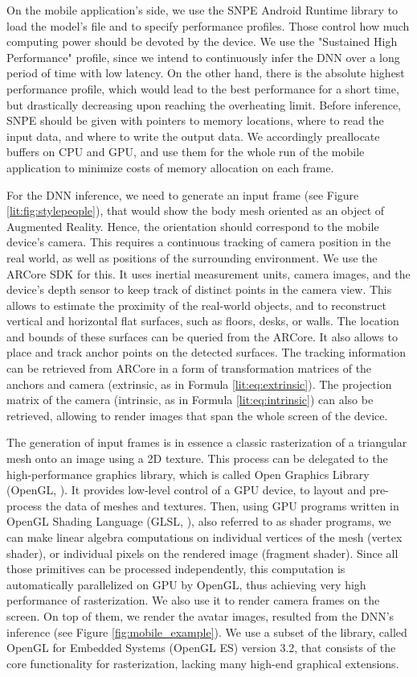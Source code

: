 On the mobile application's side, we use the SNPE Android Runtime library to load the model's file and to specify performance profiles. Those control how much computing power should be devoted by the device. We use the "Sustained High Performance" profile, since we intend to continuously infer the DNN over a long period of time with low latency. On the other hand, there is the absolute highest performance profile, which would lead to the best performance for a short time, but drastically decreasing upon reaching the overheating limit. Before inference, SNPE should be given with pointers to memory locations, where to read the input data, and where to write the output data. We accordingly preallocate buffers on CPU and GPU, and use them for the whole run of the mobile application to minimize costs of memory allocation on each frame.

For the DNN inference, we need to generate an input frame (see Figure \ref{lit:fig:stylepeople}), that would show the body mesh oriented as an object of Augmented Reality. Hence, the orientation should correspond to the mobile device's camera. This requires a continuous tracking of camera position in the real world, as well as positions of the surrounding environment. We use the ARCore SDK \cite{aux:arcore22} for this. It uses inertial measurement units, camera images, and the device's depth sensor to keep track of distinct points in the camera view. This allows to estimate the proximity of the real-world objects, and to reconstruct vertical and horizontal flat surfaces, such as floors, desks, or walls. The location and bounds of these surfaces can be queried from the ARCore. It also allows to place and track anchor points on the detected surfaces. The tracking information can be retrieved from ARCore in a form of transformation matrices of the anchors and camera (extrinsic, as in Formula \ref{lit:eq:extrinsic}). The projection matrix of the camera (intrinsic, as in Formula \ref{lit:eq:intrinsic}) can also be retrieved, allowing to render images that span the whole screen of the device. 

The generation of input frames is in essence a classic rasterization of a triangular mesh onto an image using a 2D texture. This process can be delegated to the high-performance graphics library, which is called Open Graphics Library (OpenGL, \cite{aux:opengl22}). It provides low-level control of a GPU device, to layout and pre-process the data of meshes and textures. Then, using GPU programs written in OpenGL Shading Language (GLSL, \cite{aux:glsl21}), also referred to as shader programs, we can make linear algebra computations on individual vertices of the mesh (vertex shader), or individual pixels on the rendered image (fragment shader). Since all those primitives can be processed independently, this computation is automatically parallelized on GPU by OpenGL, thus achieving very high performance of rasterization. We also use it to render camera frames on the screen. On top of them, we render the avatar images, resulted from the DNN's inference (see Figure \ref{fig:mobile_example}). We use a subset of the library, called OpenGL for Embedded Systems (OpenGL ES) version 3.2, that consists of the core functionality for rasterization, lacking many high-end graphical extensions.

